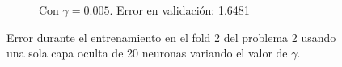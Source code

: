 \documentclass[informe.tex]{subfiles}
\begin{document}
\begin{figure}[H]
\begin{subfigure}[b]{0.49\textwidth}
                \caption{Con $\gamma=0.005$. Error en validación: 1.6481}
                \label{fig:d2-f2-2k-0005-n20}
        \end{subfigure}
        \caption{Error durante el entrenamiento en el fold 2 del problema 2 usando una sola capa oculta de 20 neuronas variando el valor de $\gamma$.}\label{fig:p2-f2-gammasVarios}
        
    \end{figure}
    
    
\end{document}
